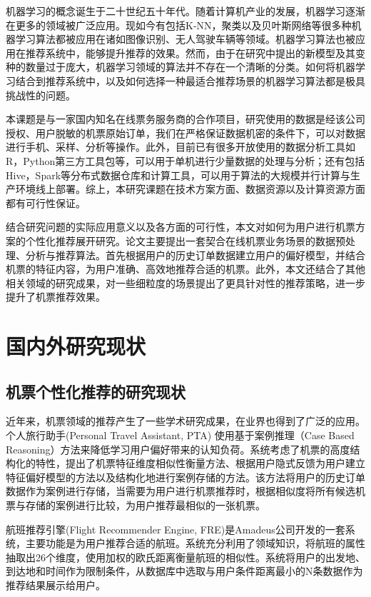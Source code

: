 机器学习的概念诞生于二十世纪五十年代\cite{portugal2015use}。随着计算机产业的发展，机器学习逐渐在更多的领域被广泛应用。现如今有包括K-NN，聚类以及贝叶斯网络等很多种机器学习算法都被应用在诸如图像识别、无人驾驶车辆等领域。机器学习算法也被应用在推荐系统中，能够提升推荐的效果。然而，由于在研究中提出的新模型及其变种的数量过于庞大，机器学习领域的算法并不存在一个清晰的分类。如何将机器学习结合到推荐系统中，以及如何选择一种最适合推荐场景的机器学习算法都是极具挑战性的问题。

本课题是与一家国内知名在线票务服务商的合作项目，研究使用的数据是经该公司授权、用户脱敏的机票原始订单，我们在严格保证数据机密的条件下，可以对数据进行手机、采样、分析等操作。此外，目前已有很多开放使用的数据分析工具如R，Python第三方工具包等，可以用于单机进行少量数据的处理与分析；还有包括Hive，Spark等分布式数据仓库和计算工具，可以用于算法的大规模并行计算与生产环境线上部署。综上，本研究课题在技术方案方面、数据资源以及计算资源方面都有可行性保证。

结合研究问题的实际应用意义以及各方面的可行性，本文对如何为用户进行机票方案的个性化推荐展开研究。论文主要提出一套契合在线机票业务场景的数据预处理、分析与推荐算法。首先根据用户的历史订单数据建立用户的偏好模型，并结合机票的特征内容，为用户准确、高效地推荐合适的机票。此外，本文还结合了其他相关领域的研究成果，对一些细粒度的场景提出了更具针对性的推荐策略，进一步提升了机票推荐效果。

\section{国内外研究现状}
\subsection{机票个性化推荐的研究现状}
近年来，机票领域的推荐产生了一些学术研究成果，在业界也得到了广泛的应用。个人旅行助手(Personal Travel Assistant, PTA)\cite{coyle2004making} 使用基于案例推理（Case Based Reasoning）\cite{aamodt1994case,kolodner2014case}方法来降低学习用户偏好带来的认知负荷。系统考虑了机票的高度结构化的特性，提出了机票特征维度相似性衡量方法、根据用户隐式反馈为用户建立特征偏好模型的方法以及结构化地进行案例存储的方法。该方法将用户的历史订单数据作为案例进行存储，当需要为用户进行机票推荐时，根据相似度将所有候选机票与存储的案例进行比较，为用户推荐最相似的一张机票。

航班推荐引擎(Flight Recommender Engine, FRE)\cite{barth2014design}是Amadeus公司开发的一套系统，主要功能是为用户推荐合适的航班。系统充分利用了领域知识，将航班的属性抽取出26个维度，使用加权的欧氏距离衡量航班的相似性。系统将用户的出发地、到达地和时间作为限制条件，从数据库中选取与用户条件距离最小的N条数据作为推荐结果展示给用户。

